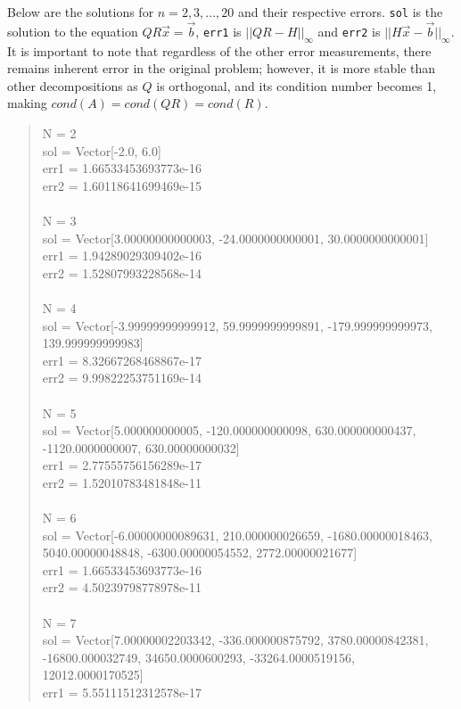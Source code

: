 \documentclass[letterpaper,12pt]{article}
\begin{document}
Below are the solutions for $n = 2,3,...,20$ and their respective errors.
\texttt{sol} is the solution to the equation $QR\vec{x}=\vec{b}$, \texttt{err1}
is $||QR - H||_{\infty}$ and \texttt{err2} is $||H\vec{x} - \vec{b}||_{\infty}$.
It is important to note that regardless of the other error measurements, there
remains inherent error in the original problem; however, it is more stable than
other decompositions as $Q$ is orthogonal, and its condition number becomes 1,
making $cond(A) = cond(QR) = cond(R)$.

\begin{quote}
N = 2
\\sol = Vector[-2.0, 6.0]
\\err1 = 1.66533453693773e-16
\\err2 = 1.60118641699469e-15
\\
\\N = 3
\\sol = Vector[3.00000000000003, -24.0000000000001, 30.0000000000001]
\\err1 = 1.94289029309402e-16
\\err2 = 1.52807993228568e-14
\\
\\N = 4
\\sol = Vector[-3.99999999999912, 59.9999999999891, -179.999999999973, 139.999999999983]
\\err1 = 8.32667268468867e-17
\\err2 = 9.99822253751169e-14
\\
\\N = 5
\\sol = Vector[5.000000000005, -120.000000000098, 630.000000000437, -1120.0000000007, 630.00000000032]
\\err1 = 2.77555756156289e-17
\\err2 = 1.52010783481848e-11
\\
\\N = 6
\\sol = Vector[-6.00000000089631, 210.000000026659, -1680.00000018463, 5040.00000048848, -6300.00000054552, 2772.00000021677]
\\err1 = 1.66533453693773e-16
\\err2 = 4.50239798778978e-11
\\
\\N = 7
\\sol = Vector[7.00000002203342, -336.000000875792, 3780.00000842381, -16800.000032749, 34650.0000600293, -33264.0000519156, 12012.0000170525]
\\err1 = 5.55111512312578e-17

\end{quote}
\end{document}
